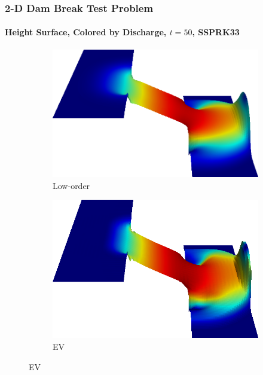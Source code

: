 \begin{frame}
\frametitle{2-D Dam Break Test Problem}
\framesubtitle{Height Surface, Colored by Discharge, $t=50$, SSPRK33}

\begin{figure}[h]
   \centering
   \begin{subfigure}{0.49\textwidth}
      \centering
      \includegraphics[width=\textwidth]{./figures/dambreak2d_height_Low_surface.png}
      \caption{Low-order}
   \end{subfigure}
   \begin{subfigure}{0.49\textwidth}
      \centering
      \includegraphics[width=\textwidth]{./figures/dambreak2d_height_EV_surface.png}
      \caption{EV}
   \end{subfigure}
\end{figure}

\end{frame}
